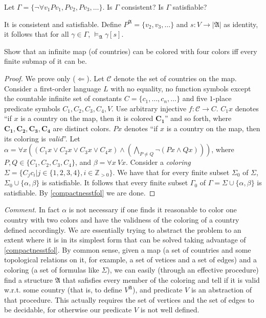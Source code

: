 \setcounter{exercise}{3}

\begin{exercise}
  Let $\Gamma=\{\neg\forall v_1 P v_1, Pv_2, Pv_3,\dots\}.$ Is $\Gamma$ consistent? Is $\Gamma$ satisfiable?
\end{exercise}

It is consistent and satisfiable. Define $P^{\mathfrak{A}}=\{v_2,v_3,\dots\}$ and $s:V\rightarrow|\mathfrak{A}|$ as identity, it follows that for all $\gamma\in \Gamma$, $\vDash_{\mathfrak{A}}\gamma[s]$.

\begin{exercise}
  Show that an infinite map (of countries) can be colored with four colors iff every finite submap of it can be.
\end{exercise}

\begin{proof}
  We prove only ($\Leftarrow$). Let $\mathcal{C}$ denote the set of countries on the map. Consider a first-order language $L$ with no equality, no function symbols except the countable infinite set of constants $C=\{c_1,\dots,c_n,\dots\}$ and five $1$-place predicate symbols $C_1,C_2,C_3,C_4,V$. Use arbitrary injective $f:\mathcal{C}\rightarrow C$. $C_1x$ denotes ``if $x$ is a country on the map, then it is colored $\mathbf{C_1}$'' and so forth, where $\mathbf{C_1,C_2,C_3,C_4}$ are distinct colors. $Px$ denotes ``if $x$ is a country on the map, then its coloring is \textit{valid}''. Let $\alpha=\forall x ((C_1x\vee C_2x\vee C_3x\vee C_4x)\wedge (\bigwedge_{P\neq Q}\neg(Px\wedge Qx)))$, where $P,Q\in\{C_1,C_2,C_3,C_4\}$, and $\beta=\forall x\ Vx$. Consider a \textit{coloring} $\Sigma=\{C_jc_i|j\in\{1,2,3,4\}, i\in\mathbb{Z}_{>0}\}$. We have that for every finite subset $\Sigma_0$ of $\Sigma$, $\Sigma_0\cup\{\alpha,\beta\}$ is satisfiable. It follows that every finite subset $\Gamma_0$ of $\Gamma=\Sigma\cup\{\alpha,\beta\}$ is satisfiable. By \ref{compactnesstfol} we are done.
\end{proof}

\textit{Comment.} In fact $\alpha$ is not necessary if one finds it reasonable to color one country with two colors and have the validness of the coloring of a country defined accordingly. We are essentially trying to abstract the problem to an extent where it is in its simplest form that can be solved taking advantage of \ref{compactnesstfol}. By common sense, given a map (a set of countries and some topological relations on it, for example, a set of vetices and a set of edges) and a coloring (a set of formulas like $\Sigma$), we can easily (through an effective procedure) find a structure $\mathfrak{A}$ that safisfies every member of the coloring and tell if it is valid w.r.t. some country (that is, to define $V^{\mathfrak{A}}$), and predicate $V$ is an abstraction of that procedure. This actually requires the set of vertices and the set of edges to be decidable, for otherwise our predicate $V$ is not well defined.


